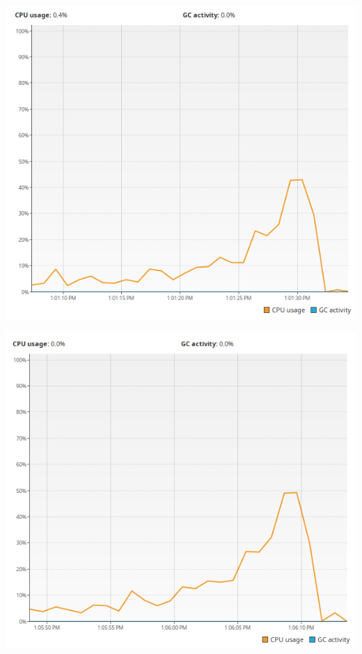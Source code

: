 \begin{center}
     \begin{minipage}[t]{0.48\textwidth}
          \centering
          \includegraphics[width=1.0\textwidth,height=1.0\textwidth]{./Graphs/cpu-susp.png}
          \label{fig:cpu-susp}
     \end{minipage}
     \hfill
     \begin{minipage}[t]{0.48\textwidth}
          \centering
          \includegraphics[width=1.0\textwidth,height=1.0\textwidth]{./Graphs/cpu-virt.png}

\end{minipage}
\end{center}
